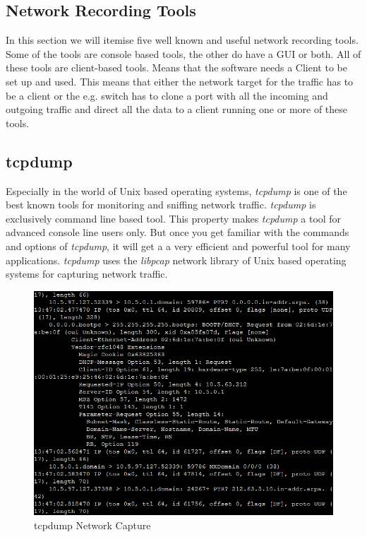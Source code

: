 \documentclass[conference]{IEEEtran}
\begin{document}
\subsection{Network Recording Tools}

In this section we will itemise five well known and useful network recording tools. Some of the tools are console based tools, the other do have a GUI or both. All of these tools are client-based tools. Means that the software needs a Client to be set up and used. This means that either the network target for the traffic has to be a client or the e.g. switch has to clone a port with all the incoming and outgoing traffic and direct all the data to a client running one or more of these tools.

\subsection*{tcpdump}

Especially in the world of Unix based operating systems, \textit{tcpdump} is one of the best known tools for monitoring and sniffing network traffic. \textit{tcpdump} is exclusively command line based tool. This property makes \textit{tcpdump} a tool for advanced console line users only. But once you get familiar with the commands and options of \textit{tcpdump}, it will get a  a very efficient and powerful tool for many applications. \textit{tcpdump} uses the \textit{libpcap} network library of Unix based operating systems for capturing network traffic.

\begin{figure}[htbp]
\centerline{\includegraphics[scale=0.4]{tcpdump.png}}
\caption{tcpdump Network Capture}
\label{tcpdump}
\end{figure}
\end{document}
